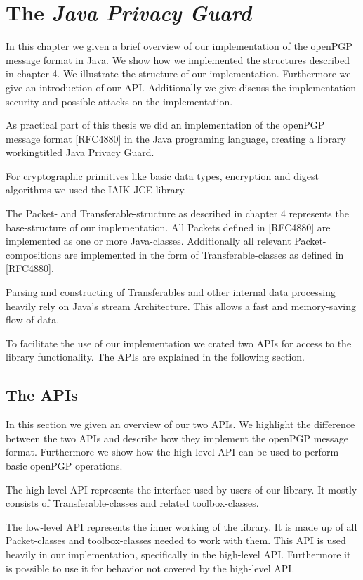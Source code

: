 \chapter{The \textit{Java Privacy Guard}} \label{chapter:jpg}

In this chapter we given a brief overview of our implementation of the openPGP message format in Java. We show how we implemented the structures described in chapter 4. We illustrate the structure of our implementation. Furthermore we give an introduction of our API.
Additionally we give discuss the implementation security and possible attacks on the implementation.


As practical part of this thesis we did an implementation of the openPGP message format [RFC4880] in the Java programing language, creating a library workingtitled Java Privacy Guard.

For cryptographic primitives like basic data types, encryption and digest algorithms we used the IAIK-JCE library.

The Packet- and Transferable-structure as described in chapter 4 represents the base-structure of our implementation. All Packets defined in [RFC4880] are implemented as one or more Java-classes. Additionally all relevant Packet-compositions are implemented in the form of Transferable-classes as defined in [RFC4880].

Parsing and constructing of Transferables and other internal data processing heavily rely on Java's stream Architecture. This allows a fast and memory-saving flow of data.

To facilitate the use of our implementation we crated two APIs for access to the library functionality. The APIs are explained in the following section.

\section{The APIs}

In this section we given an overview of our two APIs. We highlight the difference between the two APIs and describe how they implement the openPGP message format. Furthermore we show how the high-level API can be used to perform basic openPGP operations.

The high-level API represents the interface used by users of our library. It mostly consists of Transferable-classes and related toolbox-classes.

The low-level API represents the inner working of the library. It is made up of all Packet-classes and toolbox-classes needed to work with them. This API is used heavily in our implementation, specifically in the high-level API. Furthermore it is possible to use it for behavior not covered by the high-level API.

